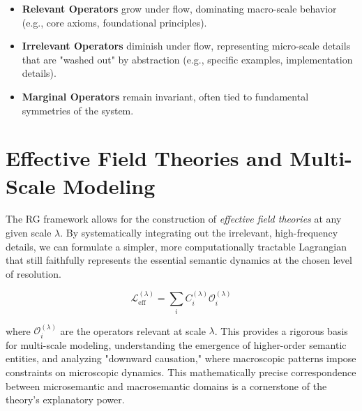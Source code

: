 \begin{itemize}

    \item \textbf{Relevant Operators} grow under flow, dominating macro-scale behavior (e.g., core axioms, foundational principles).

    \item \textbf{Irrelevant Operators} diminish under flow, representing micro-scale details that are "washed out" by abstraction (e.g., specific examples, implementation details).

    \item \textbf{Marginal Operators} remain invariant, often tied to fundamental symmetries of the system.

\end{itemize}


\section{Effective Field Theories and Multi-Scale Modeling}
\label{15.4:effective_field_theories_and_multi_scale_modeling}

The RG framework allows for the construction of \textit{effective field theories} at any given scale \(\lambda\). By systematically integrating out the irrelevant, high-frequency details, we can formulate a simpler, more computationally tractable Lagrangian that still faithfully represents the essential semantic dynamics at the chosen level of resolution.

\begin{equation}
\mathcal{L}_{\mathrm{eff}}^{(\lambda)} = \sum_{i} C_{i}^{(\lambda)} \mathcal{O}_{i}^{(\lambda)}
\end{equation}

where \(\mathcal{O}_{i}^{(\lambda)}\) are the operators relevant at scale \(\lambda\). This provides a rigorous basis for multi-scale modeling, understanding the emergence of higher-order semantic entities, and analyzing "downward causation," where macroscopic patterns impose constraints on microscopic dynamics. This mathematically precise correspondence between microsemantic and macrosemantic domains is a cornerstone of the theory's explanatory power. 